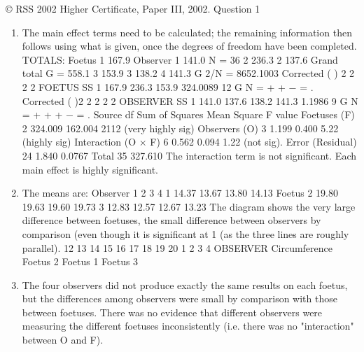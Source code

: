 \documentclass[a4paper,12pt]{article}
\begin{document}
© RSS 2002
Higher Certificate, Paper III, 2002. Question 1
\begin{enumerate} 
\item  The main effect terms need to be calculated; the remaining information then follows
using what is given, once the degrees of freedom have been completed.
TOTALS: Foetus 1 167.9 Observer 1 141.0 N = 36
2 236.3 2 137.6 Grand total G = 558.1
3 153.9 3 138.2
4 141.3 G 2/N = 8652.1003
Corrected ( ) 2
2 2 2
FOETUS
SS 1 167.9 236.3 153.9 324.0089
12
G
N
= + + − = .
Corrected ( )2
2 2 2 2
OBSERVER
SS 1 141.0 137.6 138.2 141.3 1.1986
9
G
N
= + + + − = .
Source df Sum of Squares Mean Square F value
Foetuses (F) 2 324.009 162.004 2112 (very highly sig)
Observers (O) 3 1.199 0.400 5.22 (highly sig)
Interaction (O × F) 6 0.562 0.094 1.22 (not sig).
Error (Residual) 24 1.840 0.0767
Total 35 327.610
The interaction term is not significant. Each main effect is highly significant.
\item  The means are:
Observer
1 2 3 4
1 14.37 13.67 13.80 14.13
Foetus 2 19.80 19.63 19.60 19.73
3 12.83 12.57 12.67 13.23
The diagram shows the very large difference between foetuses, the small difference between
observers by comparison (even though it is significant at 1%
(as the three lines are roughly parallel).
12
13
14
15
16
17
18
19
20
1 2 3 4
OBSERVER
Circumference
Foetus 2
Foetus 1
Foetus 3
\item  The four observers did not produce exactly the same results on each foetus, but the
differences among observers were small by comparison with those between foetuses. There
was no evidence that different observers were measuring the different foetuses inconsistently
(i.e. there was no "interaction" between O and F).

\end{enumerate}
\end{document}
